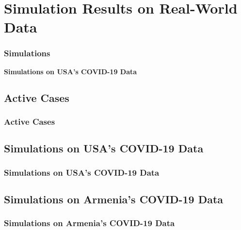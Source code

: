 \documentclass{beamer}
\begin{document}
\section{Simulation Results on Real-World Data}
\begin{frame}\frametitle{Simulations}
    \begin{center}
        \textbf{Simulations on USA's COVID-19 Data}
    \end{center}
\end{frame}

\subsection{Active Cases}
\begin{frame}\frametitle{Active Cases}

\end{frame}

\subsection{Simulations on USA's COVID-19 Data}
\begin{frame}\frametitle{Simulations on USA's COVID-19 Data}

\end{frame}

\subsection{Simulations on Armenia's COVID-19 Data}
\begin{frame}\frametitle{Simulations on Armenia's COVID-19 Data}

\end{frame}
\end{document}
